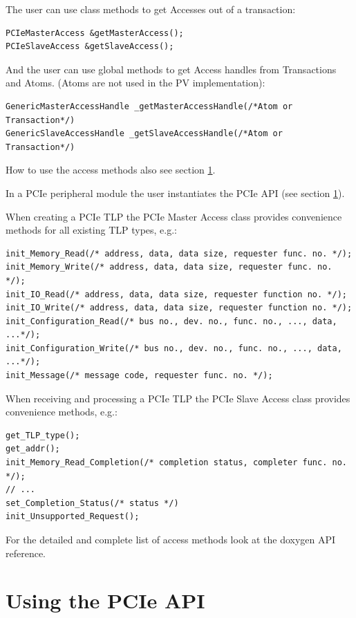 The user can use class methods to get Accesses out of a transaction:
\begin{lstlisting}
PCIeMasterAccess &getMasterAccess();
PCIeSlaveAccess &getSlaveAccess();
\end{lstlisting}

And the user can use global methods to get Access handles from Transactions and Atoms. (Atoms are not used in the PV implementation):
\begin{lstlisting}
GenericMasterAccessHandle _getMasterAccessHandle(/*Atom or Transaction*/)
GenericSlaveAccessHandle _getSlaveAccessHandle(/*Atom or Transaction*/)
\end{lstlisting}

How to use the access methods also see section \ref{sec:UsingThePCIeAPI}.

In a PCIe peripheral module the user instantiates the PCIe API (see section \ref{sec:UsingThePCIeAPI}). 

When creating a PCIe TLP the PCIe Master Access class provides convenience methods for all existing TLP types, e.g.:
\begin{lstlisting}
init_Memory_Read(/* address, data, data size, requester func. no. */);
init_Memory_Write(/* address, data, data size, requester func. no. */);
init_IO_Read(/* address, data, data size, requester function no. */);
init_IO_Write(/* address, data, data size, requester function no. */);
init_Configuration_Read(/* bus no., dev. no., func. no., ..., data, ...*/);
init_Configuration_Write(/* bus no., dev. no., func. no., ..., data, ...*/);
init_Message(/* message code, requester func. no. */);
\end{lstlisting}

When receiving and processing a PCIe TLP the PCIe Slave Access class provides convenience methods, e.g.:
\begin{lstlisting}
get_TLP_type();
get_addr();
init_Memory_Read_Completion(/* completion status, completer func. no. */);
// ...
set_Completion_Status(/* status */)
init_Unsupported_Request();
\end{lstlisting}

For the detailed and complete list of access methods look at the doxygen API reference.

\section{Using the PCIe API}
\label{sec:UsingThePCIeAPI}

